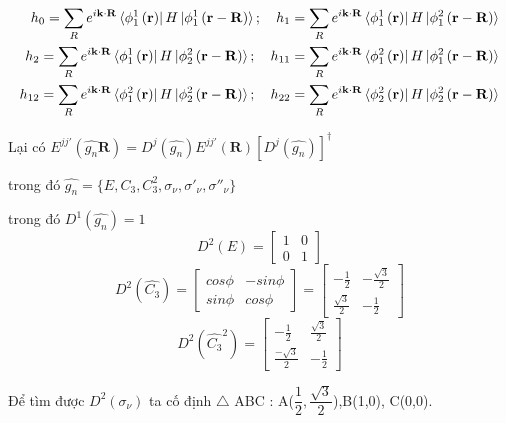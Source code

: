 \documentclass{article}
\begin{document}
\begin{align*}
    h_0 = \sum_{R} e^{i\mathbf{k\cdot R}} \bra*{\phi_1^1 \left(\mathbf{r}\right)} H \ket*{\phi_1^1\left(\mathbf{r}-\mathbf{R}\right)}; \quad h_1 = \sum_{R} e^{i\mathbf{k\cdot R}} \bra*{\phi_1^1 \left(\mathbf{r}\right)} H \ket*{\phi_1^2\left(\mathbf{r}-\mathbf{R}\right)}     \\
    h_2 = \sum_{R} e^{i\mathbf{k\cdot R}} \bra*{\phi_1^1 \left(\mathbf{r}\right)} H \ket*{\phi_2^2\left(\mathbf{r}-\mathbf{R}\right)}; \quad  h_{11} = \sum_{R} e^{i\mathbf{k\cdot R}} \bra*{\phi_1^2 \left(\mathbf{r}\right)} H \ket*{\phi_1^2\left(\mathbf{r}-\mathbf{R}\right)} \\
    h_{12} = \sum_{R} e^{i\mathbf{k\cdot R}} \bra*{\phi_1^2 \left(\mathbf{r}\right)} H \ket*{\phi_2^2\left(\mathbf{r}-\mathbf{R}\right)}; \quad h_{22} = \sum_{R} e^{i\mathbf{k\cdot R}} \bra*{\phi_2^2 \left(\mathbf{r}\right)} H \ket*{\phi_2^2\left(\mathbf{r}-\mathbf{R}\right)}
\end{align*}

Lại có $E^{jj'} \left(\hat{g_n}\textbf{R}\right)= D^j(\hat{g_n}) E^{jj'}
    \left(\textbf{R}\right)\left[D^j(\hat{g_n})\right]^{\dagger}$

trong đó $\hat{g_n} = \{E,C_3,C^2_3,\sigma_\nu,\sigma'_\nu,\sigma''_\nu\}$

trong đó $D^1(\hat{g_n}) = 1$
\[
    \renewcommand{\arraystretch}{0.75}
    D^2(E) = \begin{bmatrix}
        1 & 0 \\
        0 & 1
    \end{bmatrix}
\]
\[
    \renewcommand{\arraystretch}{0.75}
    D^2(\hat{C_3}) = \begin{bmatrix}
        cos\phi & -sin\phi \\
        sin\phi & cos\phi
    \end{bmatrix}
    = \begin{bmatrix}
        -\frac{1}{2}       & -\frac{\sqrt{3}}{2} \\
        \frac{\sqrt{3}}{2} & -\frac{1}{2}
    \end{bmatrix}
\]
\[
    \renewcommand{\arraystretch}{0.75}
    D^2(\hat{C_3}^2) =
    \begin{bmatrix}
        -\frac{1}{2}        & \frac{\sqrt{3}}{2} \\
        \frac{-\sqrt{3}}{2} & -\frac{1}{2}
    \end{bmatrix}
\]

Để tìm được $D^2(\sigma_\nu)$ ta cố định $\bigtriangleup$ ABC : A($\dfrac{1}{2},\dfrac{\sqrt{3}}{2}$),B(1,0), C(0,0).
\end{document}
